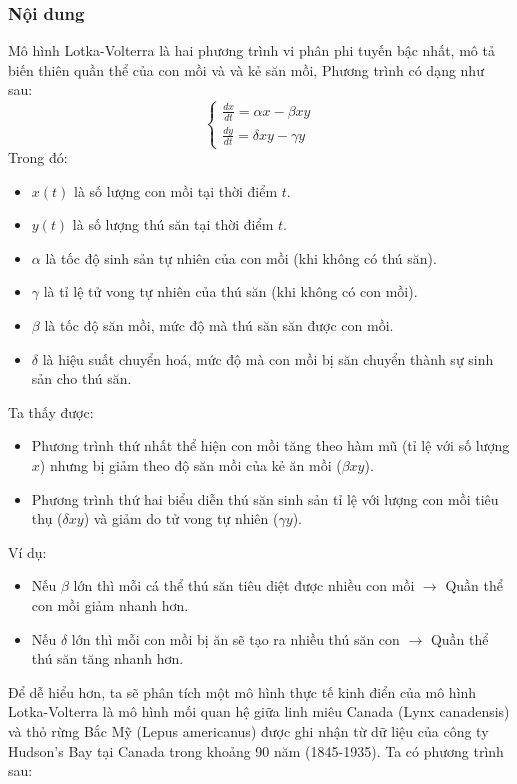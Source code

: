 \documentclass[a4paper,15pt]{article}
\begin{document}
\subsubsection{Nội dung}
Mô hình Lotka-Volterra là hai phương trình vi phân phi tuyến bậc nhất, mô tả biến thiên quần thể của con mồi và và kẻ săn mồi, Phương trình có dạng như sau:
\[
    \begin{cases}
    \frac{dx}{dt} = \alpha x - \beta x y \\
    \frac{dy}{dt} = \delta x y - \gamma y
    \end{cases}
\]
Trong đó:
\begin{itemize}
    \item $x(t)$ là số lượng con mồi tại thời điểm $t$.
    \item $y(t)$ là số lượng thú săn tại thời điểm $t$.
    \item $\alpha$ là tốc độ sinh sản tự nhiên của con mồi (khi không có thú săn).
    \item $\gamma$ là tỉ lệ tử vong tự nhiên của thú săn (khi không có con mồi).
    \item $\beta$ là tốc độ săn mồi, mức độ mà thú săn săn được con mồi.
    \item $\delta$ là hiệu suất chuyển hoá, mức độ mà con mồi bị săn chuyển thành sự sinh sản cho thú săn.
\end{itemize}
Ta thấy được:
\begin{itemize}
    \item Phương trình thứ nhất thể hiện con mồi tăng theo hàm mũ (tỉ lệ với số lượng $x$) nhưng bị giảm theo độ săn mồi của kẻ ăn mồi ($\beta x y$).
    \item Phương trình thứ hai biểu diễn thú săn sinh sản tỉ lệ với lượng con mồi tiêu thụ ($\delta x y$) và giảm do tử vong tự nhiên ($\gamma y$).
\end{itemize}
Ví dụ:
\begin{itemize}
    \item Nếu $\beta$ lớn thì mỗi cá thể thú săn tiêu diệt được nhiều con mồi $\rightarrow$ Quần thể con mồi giảm nhanh hơn. 
    \item Nếu $\delta$ lớn thì mỗi con mồi bị ăn sẽ tạo ra nhiều thú săn con $\rightarrow$ Quần thể thú săn tăng nhanh hơn.
\end{itemize}
Để dễ hiểu hơn, ta sẽ phân tích một mô hình thực tế kinh điển của mô hình Lotka-Volterra là mô hình mối quan hệ giữa linh miêu Canada (Lynx canadensis) và thỏ rừng Bắc Mỹ (Lepus americanus) được ghi nhận từ dữ liệu của công ty Hudson's Bay tại Canada trong khoảng 90 năm (1845-1935). Ta có phương trình sau:
\end{document}
